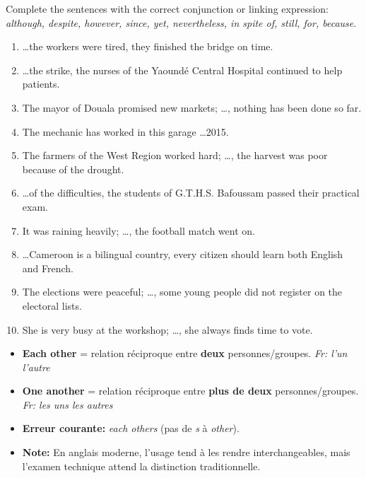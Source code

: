 \documentclass[11pt]{article}
\begin{document}
\begin{exercice}
Complete the sentences with the correct conjunction or linking expression: \emph{although, despite, however, since, yet, nevertheless, in spite of, still, for, because}.
\begin{enumerate}
\item \ldots the workers were tired, they finished the bridge on time.
\item \ldots the strike, the nurses of the Yaoundé Central Hospital continued to help patients.
\item The mayor of Douala promised new markets; \ldots, nothing has been done so far.
\item The mechanic has worked in this garage \ldots 2015.
\item The farmers of the West Region worked hard; \ldots, the harvest was poor because of the drought.
\item \ldots of the difficulties, the students of G.T.H.S. Bafoussam passed their practical exam.
\item It was raining heavily; \ldots, the football match went on.
\item \ldots Cameroon is a bilingual country, every citizen should learn both English and French.
\item The elections were peaceful; \ldots, some young people did not register on the electoral lists.
\item She is very busy at the workshop; \ldots, she always finds time to vote.
\end{enumerate}
\end{exercice}

\begin{attention}
\begin{itemize}
\item \textbf{Each other} = relation réciproque entre \textbf{deux} personnes/groupes. \emph{Fr: l'un l'autre}
\item \textbf{One another} = relation réciproque entre \textbf{plus de deux} personnes/groupes. \emph{Fr: les uns les autres}
\item \textbf{Erreur courante:} \emph{each others} (pas de \emph{s} à \emph{other}).
\item \textbf{Note:} En anglais moderne, l'usage tend à les rendre interchangeables, mais l'examen technique attend la distinction traditionnelle.
\end{itemize}
\end{attention}
\end{document}
